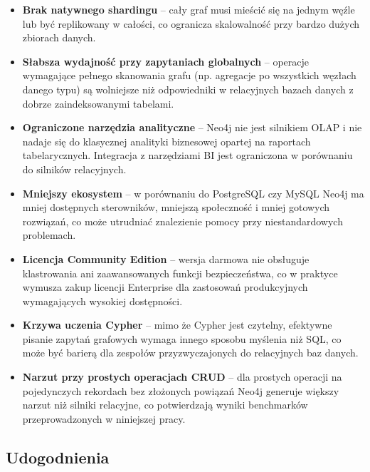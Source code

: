 \begin{itemize}
    \item \textbf{Brak natywnego shardingu} -- cały graf musi mieścić się
    na jednym węźle lub być replikowany w całości, co ogranicza skalowalność
    przy bardzo dużych zbiorach danych.
    \item \textbf{Słabsza wydajność przy zapytaniach globalnych} -- operacje
    wymagające pełnego skanowania grafu (np. agregacje po wszystkich węzłach
    danego typu) są wolniejsze niż odpowiedniki w relacyjnych bazach danych
    z dobrze zaindeksowanymi tabelami.
    \item \textbf{Ograniczone narzędzia analityczne} -- Neo4j nie jest
    silnikiem OLAP i nie nadaje się do klasycznej analityki biznesowej
    opartej na raportach tabelarycznych. Integracja z narzędziami BI
    jest ograniczona w porównaniu do silników relacyjnych.
    \item \textbf{Mniejszy ekosystem} -- w porównaniu do PostgreSQL czy
    MySQL Neo4j ma mniej dostępnych sterowników, mniejszą społeczność
    i mniej gotowych rozwiązań, co może utrudniać znalezienie pomocy
    przy niestandardowych problemach.
    \item \textbf{Licencja Community Edition} -- wersja darmowa nie obsługuje
    klastrowania ani zaawansowanych funkcji bezpieczeństwa, co w praktyce
    wymusza zakup licencji Enterprise dla zastosowań produkcyjnych
    wymagających wysokiej dostępności.
    \item \textbf{Krzywa uczenia Cypher} -- mimo że Cypher jest czytelny,
    efektywne pisanie zapytań grafowych wymaga innego sposobu myślenia
    niż SQL, co może być barierą dla zespołów przyzwyczajonych do
    relacyjnych baz danych.
    \item \textbf{Narzut przy prostych operacjach CRUD} -- dla prostych
    operacji na pojedynczych rekordach bez złożonych powiązań Neo4j
    generuje większy narzut niż silniki relacyjne, co potwierdzają
    wyniki benchmarków przeprowadzonych w niniejszej pracy.
\end{itemize}

\subsection{Udogodnienia}

